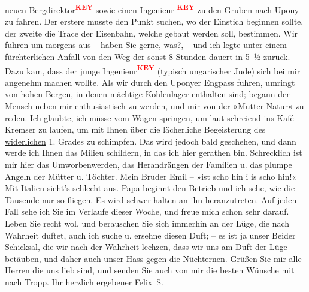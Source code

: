 \begin{ledgroupsized}[t]{13cm}
               neuen Bergdirektor\textcolor{red}{\textsuperscript{\textbf{KEY}}} sowie einen Ingenieur \textcolor{red}{\textsuperscript{\textbf{KEY}}} zu den Gruben nach Upony zu fahren. Der erstere musste den Punkt
               suchen, wo der Einstich beginnen sollte, der zweite die Trace der Eisenbahn, welche
               gebaut werden soll, bestimmen. Wir fuhren um 
               morgens aus – haben Sie gerne, was?, – und ich legte unter einem fürchterlichen
               Anfall von \label{K_L03105-11v}\label{K_L03105-11h} den Weg der sonst 8 Stunden
               dauert in 5 ½ zurück. Dazu kam, dass der junge Ingenieur\textcolor{red}{\textsuperscript{\textbf{KEY}}} (typisch ungarischer Jude) sich bei mir angenehm
               machen wollte. Als wir durch den Uponyer
                  Engpass fuhren, umringt von hohen Bergen, in denen mächtige Kohlenlager
               enthalten sind; be{\pb}gann der
               Mensch neben mir enthusiastisch zu werden, und mir von der »Mutter Natur« zu reden.
               Ich glaubte, ich müsse vom Wagen springen, um laut schreiend ins Kafé Kremser zu laufen, um mit Ihnen über die lächerliche
               Begeisterung des \uline{widerlichen} 1. Grades zu schimpfen.
               Das wird jedoch bald geschehen, und dann werde ich Ihnen das Milieu schildern, in das
               ich hier gerathen bin. Schrecklich ist mir hier das Umworbenwerden, das Herandrängen
               der Familien u. das plumpe Angeln der Mütter u. Töchter. Mein Bruder Emil – »ist scho hin i is scho hin!«\pend
           \pstart
           Mit Italien sieht's schlecht aus. Papa beginnt den Betrieb und ich sehe, wie die
               Tausende nur so fliegen. Es wird schwer halten an ihn heranzutreten. Auf jeden Fall
               sehe ich Sie im Verlaufe dieser Woche, und freue mich schon sehr darauf. \pend
           \pstart
           Leben Sie recht wol, und berauschen Sie sich immerhin an der Lüge, die nach Wahrheit
               duftet, auch ich suche u. ersehne diesen Duft; – es ist ja unser Beider Schicksal,
               die wir nach der Wahrheit lechzen, dass wir uns am Duft der Lüge betäuben, und daher
               auch unser Hass gegen die Nüchternen. \pend
           \pstart
           Grüßen Sie mir alle Herren die uns lieb sind, und senden Sie auch von mir die besten
               Wünsche mit nach Tropp. \pend
           \pstart  Ihr herzlich ergebener \spacefill\mbox{Felix S.}\pend{}
         

\end{ledgroupsized}
